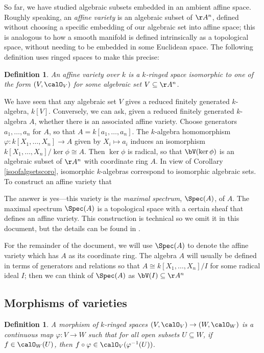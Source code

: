 \documentclass[12pt]{amsart}
\theoremstyle{plain}
\newtheorem{definition}[theorem]{Definition}
\begin{document}
So far, we have studied algebraic subsets embedded in an ambient affine space.
Roughly speaking, an \emph{affine variety} is an algebraic subset of $\AA^n$, defined without choosing a specific embedding of our algebraic set into affine space;
this is analogous to how a smooth manifold is defined intrinsically as a topological space, without needing to be embedded in some Euclidean space.
The following definition uses ringed spaces to make this precise:

\begin{definition}
An affine variety over $k$ is a $k$-ringed space isomorphic to one of the form $(V, \calO_V)$ for some algebraic set $V \subseteq \AA^n$.
\end{definition}

We have seen that any algebraic set $V$ gives a reduced finitely generated $k$-algebra, $k[V]$.
Conversely, we can ask, given a reduced finitely generated $k$-algebra $A$, whether there is an associated affine variety.
Choose generators $a_1, \ldots, a_n$ for $A$, so that $A = k[a_1, \ldots, a_n]$.
The $k$-algebra homomorphism $\varphi : k[X_1, \ldots, X_n] \to A$ given by $X_i \mapsto a_i$ induces an isomorphism $k[X_1, \ldots, X_n] / \ker \phi \cong A$.
Then $\ker\phi$ is radical, so that $\bV(\ker \phi)$ is an algebraic subset of $\AA^n$ with coordinate ring $A$.
In view of Corollary \ref{isoofalgsetscoro}, isomorphic $k$-algebras correspond to isomorphic algebraic sets.
To construct an affine variety that 

The answer is yes---this variety is the \emph{maximal spectrum}, $\Spec(A)$, of $A$.
The maximal spectrum $\Spec(A)$ is a topological space with a certain sheaf that defines an affine variety.
This construction is technical so we omit it in this document, but the details can be found in \cite[Chapter 3]{Milne13}.

For the remainder of the document, we will use $\Spec(A)$ to denote the affine variety which has $A$ as its coordinate ring.
The algebra $A$ will usually be defined in terms of generators and relations so that $A \cong k[X_1, \ldots, X_n] / I$ for some radical ideal $I$; 
then we can think of $\Spec(A)$ as $\bV(I) \subseteq \AA^n$

\subsection{Morphisms of varieties}
\begin{definition}
A morphism of $k$-ringed spaces $(V, \calO_V) \to (W, \calO_W)$ is a continuous map $\varphi : V \to W$ such that for all open subsets $U \subseteq W$, if $f \in \calO_W(U)$, then $f \circ \varphi \in \calO_V(\varphi^{-1}(U))$.
\end{definition}
\end{document}
